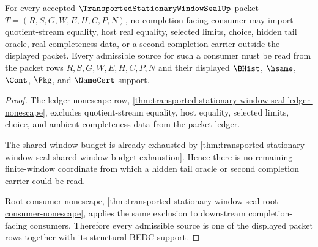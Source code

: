 \begin{theorem}
\label{thm:transported-stationary-window-seal-completion-source-nonescape}
For every accepted $\TransportedStationaryWindowSealUp$ packet $T=(R,S,G,W,E,H,C,P,N)$, no completion-facing consumer may import quotient-stream equality, host real equality, selected limits, choice, hidden tail oracle, real-completeness data, or a second completion carrier outside the displayed packet. Every admissible source for such a consumer must be read from the packet rows $R,S,G,W,E,H,C,P,N$ and their displayed $\BHist$, $\hsame$, $\Cont$, $\Pkg$, and $\NameCert$ support.
\end{theorem}
\begin{proof}
The ledger nonescape row, \autoref{thm:transported-stationary-window-seal-ledger-nonescape}, excludes quotient-stream equality, host equality, selected limits, choice, and ambient completeness data from the packet ledger.

The shared-window budget is already exhausted by \autoref{thm:transported-stationary-window-seal-shared-window-budget-exhaustion}. Hence there is no remaining finite-window coordinate from which a hidden tail oracle or second completion carrier could be read.

Root consumer nonescape, \autoref{thm:transported-stationary-window-seal-root-consumer-nonescape}, applies the same exclusion to downstream completion-facing consumers. Therefore every admissible source is one of the displayed packet rows together with its structural BEDC support.
\end{proof}
